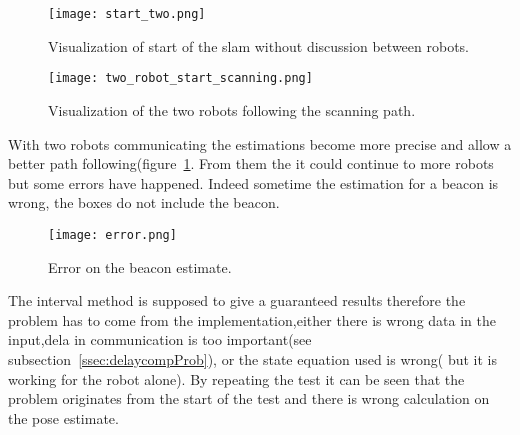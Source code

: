 \begin{figure}[H]
\centering
\begin{minipage}[b]{0.4\textwidth}
\texttt{[image: start\_two.png]}
\caption{Visualization of start of the slam without discussion between robots.}
\label{fig:twoRobResDeb}
\end{minipage}
\begin{minipage}[b]{0.4\textwidth}
\texttt{[image: two\_robot\_start\_scanning.png]}
\caption{Visualization of the two robots following the scanning path.}
\label{fig:twoRobResEnd}
\end{minipage}
\end{figure}

With two robots communicating the estimations become more precise and allow a better path following(figure~\ref{fig:twoRobResEnd}.
From them the it could continue to more robots but some errors have happened. Indeed sometime the estimation for a beacon is wrong, the boxes do not include the beacon. 

\begin{figure}[H]
\centering
\texttt{[image: error.png]}
\caption{Error on the beacon estimate.}
\label{fig:errorEst}
\end{figure}

The interval method is supposed to give a guaranteed results therefore the problem has to come from the implementation,either there is wrong data in the input,dela in communication is too important(see subsection~\ref{ssec:delaycompProb}), or the state equation used is wrong( but it is working for the robot alone).
By repeating the test it can be seen that the problem originates from the start of the test and there is wrong calculation on the pose estimate.
